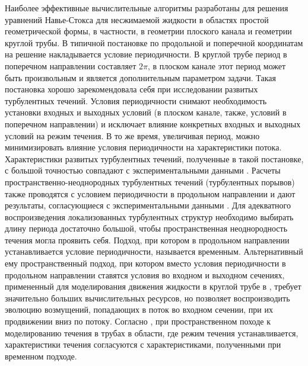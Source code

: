 Наиболее эффективные вычислительные алгоритмы разработаны для решения уравнений Навье-Стокса для несжимаемой жидкости в областях простой геометрической формы, в частности, в геометрии плоского канала и геометрии круглой трубы. В типичной постановке по продольной и поперечной координатам на решение накладывается условие периодичности. В круглой трубе период в поперечном направлении составляет $2\pi$, в плоском канале этот период может быть произвольным и является дополнительным параметром задачи. Такая постановка хорошо зарекомендовала себя при исследовании развитых турбулентных течений. Условия периодичности снимают необходимость установки входных и выходных условий (в плоском канале, также, условий в поперечном направлении) и исключает влияние конкретных входных и выходных условий на режим течения. В то же время, увеличивая период, можно минимизировать влияние условия периодичности на характеристики потока. Характеристики развитых турбулентных течений, полученные в такой постановке, с большой точностью совпадают с экспериментальными данными \cite{Kim1987, Eggels1994, Nikitin1996}. Расчеты пространственно-неоднородных турбулентных течений (турбулентных порывов) также проводятся с условием периодичности в продольном направлении и дают результаты, согласующиеся с экспериментальными данными \cite{Priymak2004, Avila2010, Song2017}. Для адекватного воспроизведения локализованных турбулентных структур необходимо выбирать длину периода достаточно большой, чтобы пространственная неоднородность течения могла проявить себя. Подход, при котором в продольном направлении устанавливается условие периодичности, называется временным. Альтернативный ему пространственный подход, при котором вместо условия периодичности в продольном направлении ставятся условия во входном и выходном сечениях, примененный для моделирования движения жидкости в круглой трубе в \cite{Nikitin1995}, требует значительно больших вычислительных ресурсов, но позволяет воспроизводить эволюцию возмущений, попадающих в поток во входном сечении, при их продвижении вниз по потоку. Согласно \cite{Nikitin1995}, при пространственном походе к моделированию течения в трубах в области, где режим течения устанавливается, характеристики течения согласуются с характеристиками, полученными при временном подходе. 

